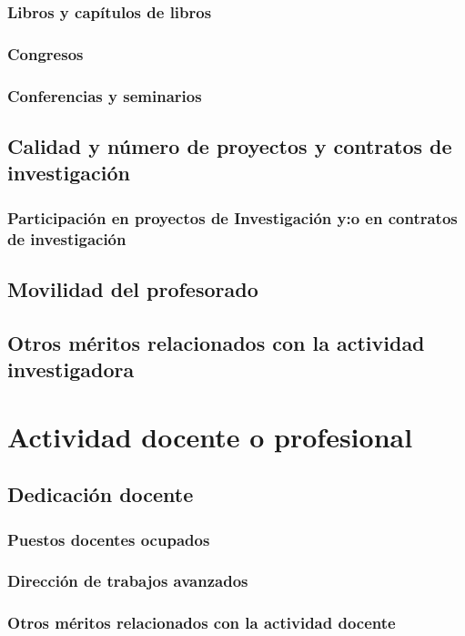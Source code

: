 \newpage\subsubsection{Libros y capítulos de libros}
\newpage\subsubsection{Congresos}
\newpage\subsubsection{Conferencias y seminarios}
\newpage\subsection{Calidad y número de proyectos y contratos de investigación}
\newpage\subsubsection{Participación en proyectos de Investigación y:o en contratos de investigación}
\newpage\subsection{Movilidad del profesorado}
\newpage\subsection{Otros méritos relacionados con la actividad investigadora}
\newpage\section{Actividad docente o profesional}
\newpage\subsection{Dedicación docente}
\newpage\subsubsection{Puestos docentes ocupados}
\newpage\subsubsection{Dirección de trabajos avanzados}
\newpage\subsubsection{Otros méritos relacionados con la actividad docente}
